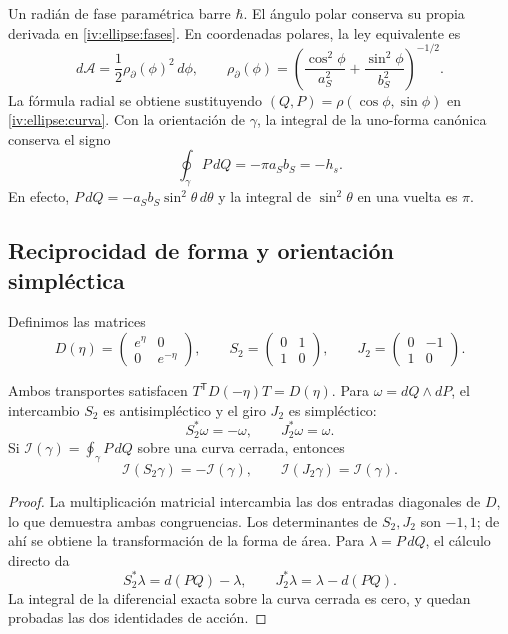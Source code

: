 Un radián de fase paramétrica barre \(\hbar\). El ángulo
polar conserva su propia derivada en
\eqref{iv:ellipse:fases}. En coordenadas polares, la ley
equivalente es
\[
 d\mathcal A=\frac12\rho_{\partial}(\phi)^2\,d\phi,\qquad
 \rho_{\partial}(\phi)=
 \left(\frac{\cos^2\phi}{a_S^2}
       +\frac{\sin^2\phi}{b_S^2}\right)^{-1/2}.
\]
La fórmula radial se obtiene sustituyendo
\((Q,P)=\rho(\cos\phi,\sin\phi)\) en
\eqref{iv:ellipse:curva}. Con la orientación de
\(\gamma\), la integral de la uno-forma canónica conserva
el signo
\begin{equation}
 \oint_\gamma P\,dQ=-\pi a_Sb_S=-h_s.
 \label{iv:ellipse:accion-orientada}
\end{equation}
En efecto, \(P\,dQ=-a_Sb_S\sin^2\theta\,d\theta\) y
la integral de \(\sin^2\theta\) en una vuelta es \(\pi\).

\subsection{Reciprocidad de forma y orientación simpléctica}
\label{iv:ellipse:reciprocidad}

Definimos las matrices
\begin{equation}
 D(\eta)=\begin{pmatrix}e^\eta&0\\0&e^{-\eta}\end{pmatrix},
 \qquad
 S_2=\begin{pmatrix}0&1\\1&0\end{pmatrix},
 \qquad
 J_2=\begin{pmatrix}0&-1\\1&0\end{pmatrix}.
 \label{iv:ellipse:transportes}
\end{equation}

\begin{proposition}
\label{iv:ellipse:accion-reciproca}
Ambos transportes satisfacen
\(T^{\mathsf T}D(-\eta)T=D(\eta)\).
Para \(\omega=dQ\wedge dP\), el intercambio \(S_2\) es
antisimpléctico y el giro \(J_2\) es simpléctico:
\[
 S_2^*\omega=-\omega,\qquad J_2^*\omega=\omega.
\]
Si \(\mathcal I(\gamma)=\oint_\gamma P\,dQ\) sobre una
curva cerrada, entonces
\begin{equation}
 \mathcal I(S_2\gamma)=-\mathcal I(\gamma),\qquad
 \mathcal I(J_2\gamma)=\mathcal I(\gamma).
 \label{iv:ellipse:signos-accion}
\end{equation}
\end{proposition}
\begin{proof}
La multiplicación matricial intercambia las dos entradas
diagonales de \(D\), lo que demuestra ambas congruencias.
Los determinantes de \(S_2,J_2\) son \(-1,1\);
de ahí se obtiene la transformación de la forma de área.
Para \(\lambda=P\,dQ\), el cálculo directo da
\[
 S_2^*\lambda=d(PQ)-\lambda,\qquad
 J_2^*\lambda=\lambda-d(PQ).
\]
La integral de la diferencial exacta sobre la curva cerrada
es cero, y quedan probadas las dos identidades de acción.
\end{proof}

